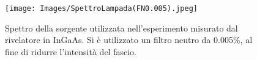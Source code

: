\begin{figure}[h!]
    \centering
    \texttt{[image: Images/SpettroLampada(FN0.005).jpeg]}
    \caption{Spettro della sorgente utilizzata nell'esperimento misurato dal rivelatore in InGaAs. Si è utilizzato un filtro neutro da 0.005\%, al fine di ridurre l'intensità del fascio.}
    \label{fig:my_label}
\end{figure}